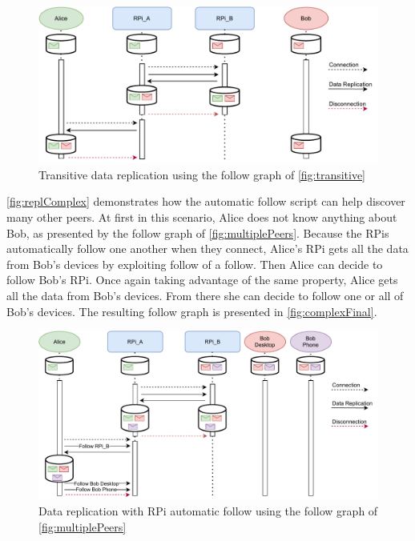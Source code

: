 \documentclass[a4paper,11pt,oneside]{report}
\begin{document}
\begin{figure}
  \includegraphics[width=\linewidth]{figures/replTransitive.pdf}
  \caption{Transitive data replication using the follow graph of \autoref{fig:transitive}}
  \label{fig:replTransitive}
\end{figure}

\autoref{fig:replComplex} demonstrates how the automatic follow script can help discover many other peers. At first in this scenario, Alice does not know anything about Bob, as presented by the follow graph of \autoref{fig:multiplePeers}. Because the RPis automatically follow one another when they connect, Alice's RPi gets all the data from Bob's devices by exploiting follow of a follow. Then Alice can decide to follow Bob's RPi. Once again taking advantage of the same property, Alice gets all the data from Bob's devices. From there she can decide to follow one or all of Bob's devices. The resulting follow graph is presented in \autoref{fig:complexFinal}.

\begin{figure}
  \includegraphics[width=\linewidth]{figures/replComplex.pdf}
  \caption{Data replication with RPi automatic follow using the follow graph of \autoref{fig:multiplePeers}}
  \label{fig:replComplex}
\end{figure}
\end{document}
